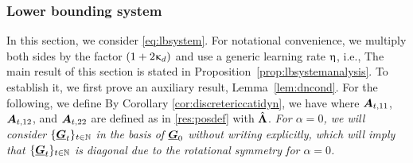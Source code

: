 \subsubsection{Lower bounding system}  
In this section, we consider   \eqref{eq:lbsystem}. For notational convenience, we multiply both sides by the factor $(1 + 2 \upkappa_d)$ and use a generic learning rate $\upeta$, i.e.,
The main result of this section is stated in Proposition~\ref{prop:lbsystemanalysis}. To establish it, we first prove an auxiliary result, Lemma~\ref{lem:dncond}.   For the following,   we define
 By  Corollary \ref{cor:discretericcatidyn},  we have
where $\boldsymbol{A}_{t,11}$,   $\boldsymbol{A}_{t,12}$,  and $ \boldsymbol{A}_{t,22}$ are defined as in \ref{res:posdef} with   $\hat{\boldsymbol{\Lambda}}$.  \emph{For $\alpha = 0$,  we will consider $\{ \underline{\boldsymbol{G}}_{t} \}_{t \in \mathbb{N}}$ in the basis of  $\underline{\boldsymbol{G}}_{0}$ without writing explicitly, which will imply that $\{ \underline{\boldsymbol{G}}_{t} \}_{t \in \mathbb{N}}$ is  diagonal due to the rotational symmetry for  $\alpha = 0$.}

